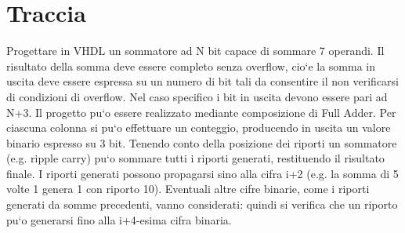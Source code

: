 %

\section{Traccia}

Progettare in VHDL un sommatore ad N bit capace di sommare 7 operandi.
Il risultato della somma deve essere completo senza overflow, cio`e
la somma in uscita deve essere espressa su un numero di bit tali da
consentire il non verificarsi di condizioni di overflow. Nel caso
specifico i bit in uscita devono essere pari ad N+3. Il progetto pu`o
essere realizzato mediante composizione di Full Adder. Per ciascuna
colonna si pu`o effettuare un conteggio, producendo in uscita un valore
binario espresso su 3 bit. Tenendo conto della posizione dei riporti
un sommatore (e.g. ripple carry) pu`o sommare tutti i riporti generati,
restituendo il risultato finale. I riporti generati possono propagarsi
sino alla cifra i+2 (e.g. la somma di 5 volte 1 genera 1 con riporto
10). Eventuali altre cifre binarie, come i riporti generati da somme
precedenti, vanno considerati: quindi si verifica che un riporto pu`o
generarsi fino alla i+4-esima cifra binaria.

%

